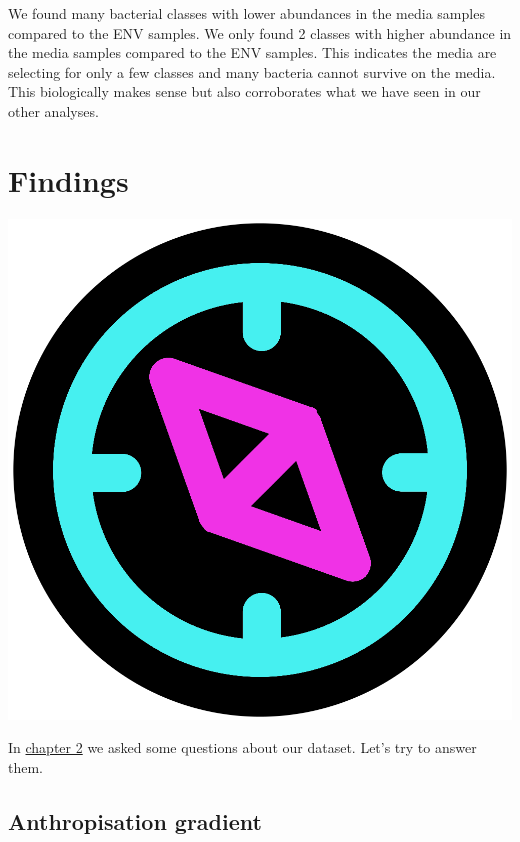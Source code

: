 \documentclass[
]{book}
\begin{document}
We found many bacterial classes with lower abundances in the media samples compared to the ENV samples.
We only found 2 classes with higher abundance in the media samples compared to the ENV samples.
This indicates the media are selecting for only a few classes and many bacteria cannot survive on the media.
This biologically makes sense but also corroborates what we have seen in our other analyses.

\hypertarget{findings}{%
\section{Findings}\label{findings}}

\includegraphics{figures/compass.png}

In \protect\hyperlink{sum_and_qs}{chapter 2} we asked some questions about our dataset.
Let's try to answer them.

\hypertarget{anthropisation-gradient}{%
\subsection{Anthropisation gradient}\label{anthropisation-gradient}}
\end{document}
